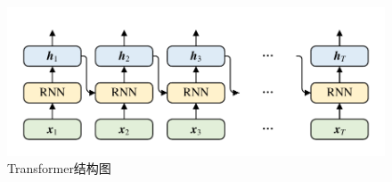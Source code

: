 \begin{figure}[htb]
	\centering
	\includegraphics[page=8, width=0.75\linewidth]{images/structure.pdf}
	\caption{Transformer结构图}
	\label{fig:Transformer}
\end{figure}